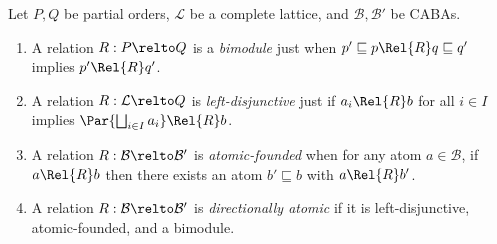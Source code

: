 \documentclass[a4paper,UKenglish,cleveref, autoref]{lipics-v2021}
\begin{document}
\begin{definition}
  Let $P, Q$ be partial orders, $\mathcal{L}$ be a complete lattice, and
  $\mathcal{B}, \mathcal{B}'$ be CABAs.
  \begin{enumerate}
    \item A relation \(R : P \relto Q\) is a \emph{bimodule} just when \(p'
      \sqsubseteq p \Rel{R} q \sqsubseteq q'\) implies \(p' \Rel{R} q'\).
    \item A relation \(R : \mathcal{L} \relto Q\) is \emph{left-disjunctive}
      just if \(a_i \Rel{R} b\) for all $i \in I$ implies \(\Par{\bigsqcup_{i
      \in I} a_i} \Rel{R} b\).
    \item A relation \(R : \mathcal{B} \relto \mathcal{B}'\) is
      \emph{atomic-founded} when for any atom \(a \in \mathcal{B}\), if \(a
      \Rel{R} b\) then there exists an atom \(b' \sqsubseteq b\) with \(a
      \Rel{R} b'\).
    \item A relation \(R : \mathcal{B} \relto \mathcal{B}'\) is
      \emph{directionally atomic} if it is left-disjunctive,
      atomic-founded, and a bimodule.
  \end{enumerate}
\end{definition}
\end{document}
